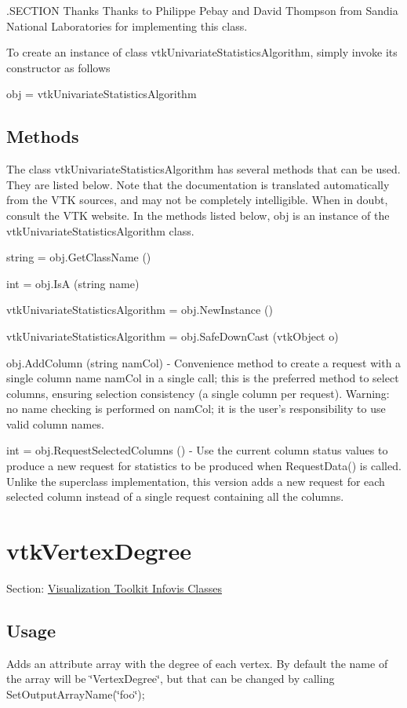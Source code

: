 .S\-E\-C\-T\-I\-O\-N Thanks Thanks to Philippe Pebay and David Thompson from Sandia National Laboratories for implementing this class.

To create an instance of class vtk\-Univariate\-Statistics\-Algorithm, simply invoke its constructor as follows \begin{DoxyVerb}  obj = vtkUnivariateStatisticsAlgorithm
\end{DoxyVerb}
 \hypertarget{vtkwidgets_vtkxyplotwidget_Methods}{}\subsection{Methods}\label{vtkwidgets_vtkxyplotwidget_Methods}
The class vtk\-Univariate\-Statistics\-Algorithm has several methods that can be used. They are listed below. Note that the documentation is translated automatically from the V\-T\-K sources, and may not be completely intelligible. When in doubt, consult the V\-T\-K website. In the methods listed below, {\ttfamily obj} is an instance of the vtk\-Univariate\-Statistics\-Algorithm class. 
\begin{DoxyItemize}
\item {\ttfamily string = obj.\-Get\-Class\-Name ()}  
\item {\ttfamily int = obj.\-Is\-A (string name)}  
\item {\ttfamily vtk\-Univariate\-Statistics\-Algorithm = obj.\-New\-Instance ()}  
\item {\ttfamily vtk\-Univariate\-Statistics\-Algorithm = obj.\-Safe\-Down\-Cast (vtk\-Object o)}  
\item {\ttfamily obj.\-Add\-Column (string nam\-Col)} -\/ Convenience method to create a request with a single column name {\ttfamily nam\-Col} in a single call; this is the preferred method to select columns, ensuring selection consistency (a single column per request). Warning\-: no name checking is performed on {\ttfamily nam\-Col}; it is the user's responsibility to use valid column names.  
\item {\ttfamily int = obj.\-Request\-Selected\-Columns ()} -\/ Use the current column status values to produce a new request for statistics to be produced when Request\-Data() is called. Unlike the superclass implementation, this version adds a new request for each selected column instead of a single request containing all the columns.  
\end{DoxyItemize}\hypertarget{vtkinfovis_vtkvertexdegree}{}\section{vtk\-Vertex\-Degree}\label{vtkinfovis_vtkvertexdegree}
Section\-: \hyperlink{sec_vtkinfovis}{Visualization Toolkit Infovis Classes} \hypertarget{vtkwidgets_vtkxyplotwidget_Usage}{}\subsection{Usage}\label{vtkwidgets_vtkxyplotwidget_Usage}
Adds an attribute array with the degree of each vertex. By default the name of the array will be \char`\"{}\-Vertex\-Degree\char`\"{}, but that can be changed by calling Set\-Output\-Array\-Name(\char`\"{}foo\char`\"{});

